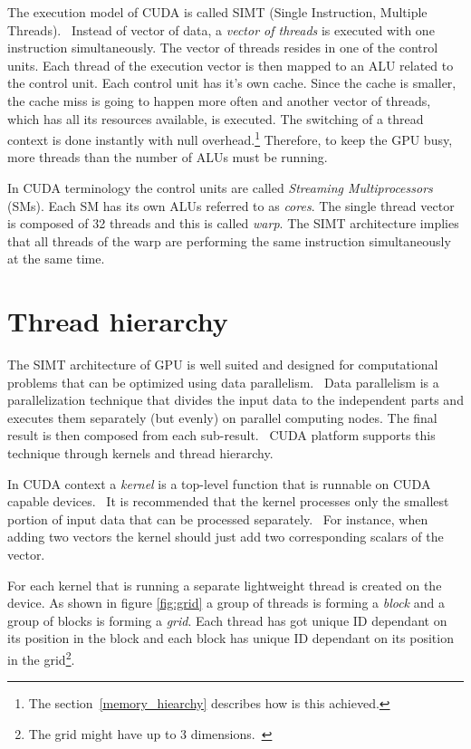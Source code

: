 \documentclass[12pt,oneside]{fithesis2}
\begin{document}
The execution model of CUDA is called SIMT (Single Instruction, Multiple Threads).~\cite{professional_cuda} Instead of vector of data, a \emph{vector of threads} is executed with one instruction simultaneously. The vector of threads resides in one of the control units. Each thread of the execution vector is then mapped to an ALU related to the control unit. Each control unit has it's own cache. Since the cache is smaller, the cache miss is going to happen more often and another vector of threads, which has all its resources available, is executed. The switching of a thread context is done instantly with null overhead.\footnote{The section~\ref{memory_hiearchy} describes how is this achieved.} Therefore, to keep the GPU busy, more threads than the number of ALUs must be running.

In CUDA terminology the control units are called \emph{Streaming Multiprocessors} (SMs). Each SM has its own ALUs referred to as \emph{cores}. The single thread vector is composed of 32 threads and this is called \emph{warp}. The SIMT architecture implies that all threads of the warp are performing the same instruction simultaneously at the same time.~\cite{cuda_guide}


\section{Thread hierarchy}
\label{thread_hierarchy}

The SIMT architecture of GPU is well suited and designed for computational problems that can be optimized using data parallelism.~\cite{professional_cuda} Data parallelism is a parallelization technique that divides the input data to the independent parts and executes them separately (but evenly) on parallel computing nodes. The final result is then composed from each sub-result.~\cite{data_parallel_algorithms} CUDA platform supports this technique through kernels and thread hierarchy.

In CUDA context a \emph{kernel} is a top-level function that is runnable on CUDA capable devices.~\cite{cuda_guide} It is recommended that the kernel processes only the smallest portion of input data that can be processed separately.~\cite{data_parallel_algorithms} For instance, when adding two vectors the kernel should just add two corresponding scalars of the vector.

For each kernel that is running a separate lightweight thread is created on the device. As shown in figure \ref{fig:grid} a group of threads is forming a \emph{block} and a group of blocks is forming a \emph{grid}. Each thread has got unique ID dependant on its position in the block and each block has unique ID dependant on its position in the grid\footnote{The grid might have up to 3 dimensions.~\cite{cuda_guide}}.
\end{document}
